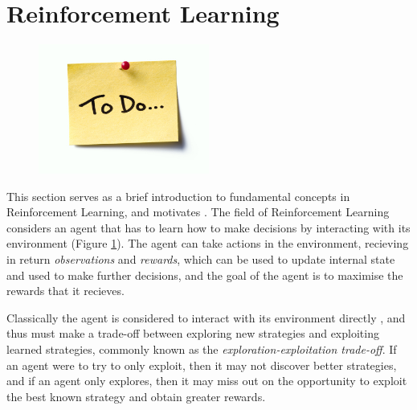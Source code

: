 






\section{Reinforcement Learning}
\label{sec:2-2-rl}



    \begin{figure}
        \centering\includegraphics[width=0.5\textwidth]{figures/todo.jpg} 
        \caption[todo]{}
        \label{fig:rl_overview}
    \end{figure}


    This section serves as a brief introduction to fundamental concepts in Reinforcement Learning, and motivates . The field of Reinforcement Learning considers an agent that has to learn how to make decisions by interacting with its environment (Figure \ref{fig:rl_overview}). The agent can take actions in the environment, recieving in return \textit{observations} and \textit{rewards}, which can be used to update internal state and used to make further decisions, and the goal of the agent is to maximise the rewards that it recieves.

    Classically the agent is considered to interact with its environment directly , and thus must make a trade-off between exploring new strategies and exploiting learned strategies, commonly known as the \textit{exploration-exploitation trade-off}. If an agent were to try to only exploit, then it may not discover better strategies, and if an agent only explores, then it may miss out on the opportunity to exploit the best known strategy and obtain greater rewards.

